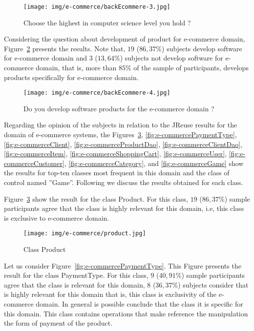 \begin{figure}[!h]
\centering
\texttt{[image: img/e-commerce/backEcommere-3.jpg]}
\caption{Choose the  highest  in  computer science level you hold ?}
\label{fig:backEcommere-3}
\end{figure}



Considering the question about development  of product for e-commerce domain, Figure~\ref{fig:backEcommere-4} presents the results. Note that, $19$ ($86,37$\%) subjects develop software for e-commerce domain and $3$ ($13,64$\%) subjects not develop software for e-commerce domain, that is, more than $85$\% of the sample of participants, develops products specifically for e-commerce domain.

\begin{figure}[!h]
\centering
\texttt{[image: img/e-commerce/backEcommere-4.jpg]}
\caption{Do you develop software products for the e-commerce domain ?}
\label{fig:backEcommere-4}
\end{figure}


Regarding the opinion of the subjects in relation to the JReuse results for the domain of e-commerce systems, the Figures~\ref{fig:e-commerceProduct}, \ref{fig:e-commercePaymentType}, \ref{fig:e-commerceClient}, \ref{fig:e-commerceProductDao}, \ref{fig:e-commerceClientDao}, \ref{fig:e-commerceItem}, \ref{fig:e-commerceShoppingCart}, \ref{fig:e-commerceUser}, \ref{fig:e-commerceCustomer},  \ref{fig:e-commerceCategory}, and \ref{fig:e-commerceGame} show the results for top-ten classes most frequent in this domain and the class of control named ''Game''. Following we discuss the results obtained for each class.




Figure~\ref{fig:e-commerceProduct} show the result for the class Product.  For this class, $19$ ($86,37$\%) sample participants agree that the class is highly relevant for this domain, i.e,  this class is exclusive to e-commerce domain. 

\begin{figure}[!h]
\centering
\texttt{[image: img/e-commerce/product.jpg]}
\caption{Class Product}
\label{fig:e-commerceProduct}
\end{figure}

\newpage
Let us consider Figure~\ref{fig:e-commercePaymentType}. This Figure presents  the result for the class PaymentType. For this class, $9$ ($40,91$\%) sample participants agree that the class is  relevant for this domain, $8$ ($36,37$\%) subjects consider  that is highly relevant for this domain  
that is,  this class is exclusivity of the e-commerce domain.  In general is possible conclude that the class it  is specific for this domain. This class contains operations that make  reference the manipulation the form of payment of the product.

